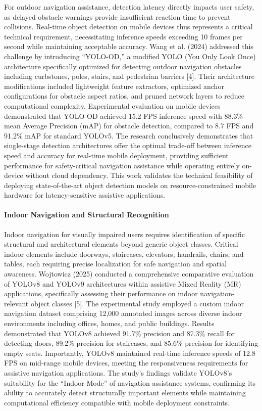 \documentclass[12pt,a4paper]{report}
\begin{document}
For outdoor navigation assistance, detection latency directly impacts user safety, as delayed obstacle warnings provide insufficient reaction time to prevent collisions. Real-time object detection on mobile devices thus represents a critical technical requirement, necessitating inference speeds exceeding 10 frames per second while maintaining acceptable accuracy. Wang et al. (2024) addressed this challenge by introducing ``YOLO-OD,'' a modified YOLO (You Only Look Once) architecture specifically optimized for detecting outdoor navigation obstacles including curbstones, poles, stairs, and pedestrian barriers [4]. Their architecture modifications included lightweight feature extractors, optimized anchor configurations for obstacle aspect ratios, and pruned network layers to reduce computational complexity. Experimental evaluation on mobile devices demonstrated that YOLO-OD achieved 15.2 FPS inference speed with 88.3\% mean Average Precision (mAP) for obstacle detection, compared to 8.7 FPS and 91.2\% mAP for standard YOLOv5. The research conclusively demonstrates that single-stage detection architectures offer the optimal trade-off between inference speed and accuracy for real-time mobile deployment, providing sufficient performance for safety-critical navigation assistance while operating entirely on-device without cloud dependency. This work validates the technical feasibility of deploying state-of-the-art object detection models on resource-constrained mobile hardware for latency-sensitive assistive applications.

\paragraph*{Indoor Navigation and Structural Recognition}

Indoor navigation for visually impaired users requires identification of specific structural and architectural elements beyond generic object classes. Critical indoor elements include doorways, staircases, elevators, handrails, chairs, and tables, each requiring precise localization for safe navigation and spatial awareness. Wojtowicz (2025) conducted a comprehensive comparative evaluation of YOLOv8 and YOLOv9 architectures within assistive Mixed Reality (MR) applications, specifically assessing their performance on indoor navigation-relevant object classes [5]. The experimental study employed a custom indoor navigation dataset comprising 12,000 annotated images across diverse indoor environments including offices, homes, and public buildings. Results demonstrated that YOLOv8 achieved 91.7\% precision and 87.3\% recall for detecting doors, 89.2\% precision for staircases, and 85.6\% precision for identifying empty seats. Importantly, YOLOv8 maintained real-time inference speeds of 12.8 FPS on mid-range mobile devices, meeting the responsiveness requirements for assistive navigation applications. The study's findings validate YOLOv8's suitability for the ``Indoor Mode'' of navigation assistance systems, confirming its ability to accurately detect structurally important elements while maintaining computational efficiency compatible with mobile deployment constraints.
\end{document}
